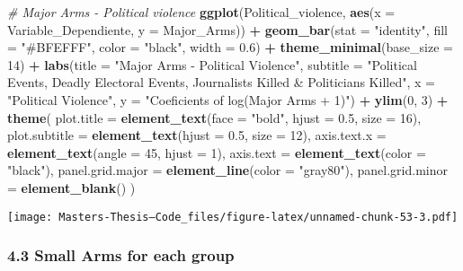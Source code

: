 \documentclass[
  11pt,
]{article}
\newenvironment{Shaded}{\begin{snugshade}}{\end{snugshade}}
\newcommand{\AttributeTok}[1]{\textcolor[rgb]{0.13,0.29,0.53}{#1}}
\newcommand{\CommentTok}[1]{\textcolor[rgb]{0.56,0.35,0.01}{\textit{#1}}}
\newcommand{\DecValTok}[1]{\textcolor[rgb]{0.00,0.00,0.81}{#1}}
\newcommand{\FloatTok}[1]{\textcolor[rgb]{0.00,0.00,0.81}{#1}}
\newcommand{\FunctionTok}[1]{\textcolor[rgb]{0.13,0.29,0.53}{\textbf{#1}}}
\newcommand{\NormalTok}[1]{#1}
\newcommand{\SpecialCharTok}[1]{\textcolor[rgb]{0.81,0.36,0.00}{\textbf{#1}}}
\newcommand{\StringTok}[1]{\textcolor[rgb]{0.31,0.60,0.02}{#1}}
\begin{document}
\begin{Shaded}
\begin{Highlighting}[]
\CommentTok{\# Major Arms {-} Political violence}
\FunctionTok{ggplot}\NormalTok{(Political\_violence, }\FunctionTok{aes}\NormalTok{(}\AttributeTok{x =}\NormalTok{ Variable\_Dependiente, }\AttributeTok{y =}\NormalTok{ Major\_Arms)) }\SpecialCharTok{+}
  \FunctionTok{geom\_bar}\NormalTok{(}\AttributeTok{stat =} \StringTok{"identity"}\NormalTok{, }\AttributeTok{fill =} \StringTok{"\#BFEFFF"}\NormalTok{, }\AttributeTok{color =} \StringTok{"black"}\NormalTok{, }\AttributeTok{width =} \FloatTok{0.6}\NormalTok{) }\SpecialCharTok{+}
  \FunctionTok{theme\_minimal}\NormalTok{(}\AttributeTok{base\_size =} \DecValTok{14}\NormalTok{) }\SpecialCharTok{+}
  \FunctionTok{labs}\NormalTok{(}\AttributeTok{title =} \StringTok{"Major Arms {-} Political Violence"}\NormalTok{,}
       \AttributeTok{subtitle =} \StringTok{"Political Events, Deadly Electoral Events, Journalists Killed \& Politicians Killed"}\NormalTok{,}
       \AttributeTok{x =} \StringTok{"Political Violence"}\NormalTok{,}
       \AttributeTok{y =} \StringTok{"Coeficients of log(Major Arms + 1)"}\NormalTok{) }\SpecialCharTok{+}
  \FunctionTok{ylim}\NormalTok{(}\DecValTok{0}\NormalTok{, }\DecValTok{3}\NormalTok{) }\SpecialCharTok{+}
  \FunctionTok{theme}\NormalTok{(}
    \AttributeTok{plot.title =} \FunctionTok{element\_text}\NormalTok{(}\AttributeTok{face =} \StringTok{"bold"}\NormalTok{, }\AttributeTok{hjust =} \FloatTok{0.5}\NormalTok{, }\AttributeTok{size =} \DecValTok{16}\NormalTok{),}
    \AttributeTok{plot.subtitle =} \FunctionTok{element\_text}\NormalTok{(}\AttributeTok{hjust =} \FloatTok{0.5}\NormalTok{, }\AttributeTok{size =} \DecValTok{12}\NormalTok{),}
    \AttributeTok{axis.text.x =} \FunctionTok{element\_text}\NormalTok{(}\AttributeTok{angle =} \DecValTok{45}\NormalTok{, }\AttributeTok{hjust =} \DecValTok{1}\NormalTok{),}
    \AttributeTok{axis.text =} \FunctionTok{element\_text}\NormalTok{(}\AttributeTok{color =} \StringTok{"black"}\NormalTok{),}
    \AttributeTok{panel.grid.major =} \FunctionTok{element\_line}\NormalTok{(}\AttributeTok{color =} \StringTok{"gray80"}\NormalTok{),}
    \AttributeTok{panel.grid.minor =} \FunctionTok{element\_blank}\NormalTok{()}
\NormalTok{  )}
\end{Highlighting}
\end{Shaded}

\texttt{[image: Masters-Thesis--Code\_files/figure-latex/unnamed-chunk-53-3.pdf]}

\subsubsection{4.3 Small Arms for each
group}\label{small-arms-for-each-group}
\end{document}
